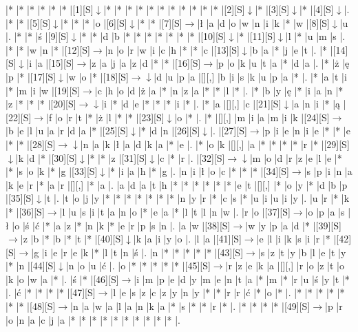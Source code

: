 \documentclass[11pt]{article}
\newcommand\drarr{$\rightarrow \!\!\!\!\! \downarrow$}
\newcommand\rarr{$\rightarrow$}
\newcommand\darr{$\downarrow$}
\begin{document}
\noindent\begin{Puzzle}{22}{25}|*	|*	|*	|*	|*	|*	|[1][S]\darr	|*	|*	|*	|*	|*	|*	|*	|*	|*	|*	|*	|[2][S]\darr	|*	|[3][S]\darr	|*	|[4][S]\darr	|.
|*	|*	|[5][S]\darr	|*	|*	|*	|o	|[6][S]\darr	|*	|*	|[7][S]\rarr	|ł	|a	|d	|o	|w	|n	|i	|k	|*	|w	|[8][S]\darr	|u	|.
|*	|*	|ś	|[9][S]\darr	|*	|*	|d	|b	|*	|*	|*	|*	|*	|*	|*	|[10][S]\darr	|*	|[11][S]\darr	|l	|*	|u	|m	|s	|.
|*	|*	|w	|n	|*	|[12][S]\rarr	|n	|o	|r	|w	|i	|c	|h	|*	|*	|c	|[13][S]\darr	|b	|a	|*	|j	|e	|t	|.
|*	|[14][S]\darr	|i	|a	|[15][S]\rarr	|z	|a	|j	|a	|z	|d	|*	|*	|[16][S]\rarr	|p	|o	|k	|u	|t	|a	|*	|d	|a	|.
|*	|ż	|ę	|p	|*	|[17][S]\darr	|w	|o	|*	|[18][S]\drarr	|d	|u	|p	|a	|[][,]{ }	|b	|i	|s	|k	|u	|p	|a	|*	|.
|*	|a	|t	|i	|*	|m	|i	|w	|[19][S]\rarr	|c	|h	|o	|d	|ż	|a	|*	|n	|z	|a	|*	|*	|l	|*	|.
|*	|b	|y	|ę	|*	|i	|a	|n	|*	|z	|*	|*	|*	|[20][S]\drarr	|i	|*	|d	|e	|*	|*	|*	|i	|*	|.
|*	|a	|[][,]{ }	|c	|[21][S]\darr	|a	|n	|i	|*	|ą	|[22][S]\rarr	|f	|o	|r	|t	|*	|ż	|l	|*	|*	|[23][S]\darr	|o	|*	|.
|*	|[][,]{ }	|m	|i	|a	|m	|i	|k	|[24][S]\rarr	|b	|e	|l	|u	|a	|r	|d	|a	|*	|[25][S]\darr	|*	|d	|n	|[26][S]\darr	|.
|[27][S]\rarr	|p	|i	|e	|n	|i	|e	|*	|*	|e	|*	|*	|[28][S]\drarr	|n	|a	|k	|ł	|a	|d	|k	|a	|*	|e	|.
|*	|o	|k	|[][,]{ }	|a	|*	|*	|*	|*	|r	|*	|[29][S]\darr	|k	|d	|*	|[30][S]\darr	|*	|*	|z	|[31][S]\darr	|c	|*	|r	|.
|[32][S]\drarr	|m	|o	|d	|r	|z	|e	|l	|e	|*	|*	|s	|o	|k	|*	|g	|[33][S]\darr	|*	|i	|a	|h	|*	|g	|.
|n	|i	|ł	|o	|c	|*	|*	|*	|[34][S]\rarr	|s	|p	|i	|n	|a	|k	|e	|r	|*	|a	|r	|[][,]{ }	|*	|a	|.
|a	|d	|a	|t	|h	|*	|*	|*	|*	|*	|*	|e	|t	|[][,]{ }	|*	|o	|y	|*	|d	|b	|p	|[35][S]\darr	|t	|.
|t	|o	|j	|y	|*	|*	|*	|*	|*	|*	|*	|n	|y	|r	|*	|c	|s	|*	|u	|i	|u	|i	|y	|.
|u	|r	|*	|k	|*	|[36][S]\rarr	|l	|u	|s	|i	|t	|a	|n	|o	|*	|e	|a	|*	|l	|t	|l	|n	|w	|.
|r	|o	|[37][S]\rarr	|o	|p	|a	|s	|ł	|o	|ś	|ć	|*	|a	|z	|*	|n	|k	|*	|e	|r	|p	|s	|n	|.
|a	|w	|[38][S]\rarr	|w	|y	|p	|a	|d	|*	|[39][S]\rarr	|z	|b	|*	|b	|*	|t	|*	|[40][S]\darr	|k	|a	|i	|y	|o	|.
|l	|a	|[41][S]\rarr	|e	|l	|i	|k	|s	|i	|r	|*	|[42][S]\rarr	|g	|i	|e	|r	|e	|k	|*	|l	|t	|n	|ś	|.
|n	|*	|*	|*	|*	|*	|[43][S]\rarr	|s	|z	|t	|y	|b	|l	|e	|t	|y	|*	|n	|[44][S]\darr	|n	|o	|u	|ć	|.
|o	|*	|*	|*	|*	|*	|[45][S]\rarr	|r	|z	|e	|k	|a	|[][,]{ }	|r	|o	|z	|t	|o	|k	|o	|w	|a	|*	|.
|ś	|*	|[46][S]\rarr	|i	|m	|p	|e	|d	|y	|m	|e	|n	|t	|a	|*	|m	|*	|r	|u	|ś	|y	|t	|*	|.
|ć	|*	|*	|*	|*	|[47][S]\rarr	|l	|e	|s	|z	|c	|z	|y	|n	|y	|*	|*	|r	|r	|ć	|*	|o	|*	|.
|*	|*	|*	|*	|*	|*	|*	|[48][S]\rarr	|n	|a	|w	|a	|l	|a	|n	|k	|a	|*	|s	|*	|*	|r	|*	|.
|*	|*	|*	|*	|[49][S]\rarr	|p	|r	|o	|n	|a	|c	|j	|a	|*	|*	|*	|*	|*	|*	|*	|*	|*	|*	|.\end{Puzzle}
\end{document}
